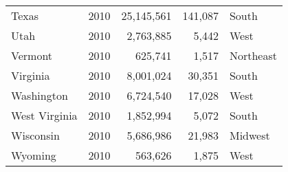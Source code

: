 \documentclass{exam}
\begin{document}
\begin{tabular}{lrrrl}
      Texas          & 2010 & 25,145,561       & 141,087           & South \\
      Utah           & 2010 & 2,763,885        & 5,442             & West \\
      Vermont        & 2010 & 625,741          & 1,517             & Northeast \\
      Virginia       & 2010 & 8,001,024        & 30,351            & South \\
      Washington     & 2010 & 6,724,540        & 17,028            & West \\
      West Virginia  & 2010 & 1,852,994        & 5,072             & South \\
      Wisconsin      & 2010 & 5,686,986        & 21,983            & Midwest \\
      Wyoming        & 2010 & 563,626          & 1,875             & West \\
      \bottomrule
    \end{tabular}
\end{document}
